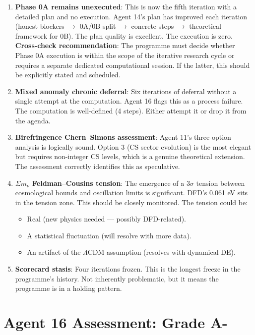 \documentclass[11pt,a4paper]{article}
\begin{document}
\begin{enumerate}
\item \textbf{Phase 0A remains unexecuted}: This is now the fifth iteration with a detailed plan and no execution. Agent 14's plan has improved each iteration (honest blockers $\to$ 0A/0B split $\to$ concrete steps $\to$ theoretical framework for 0B). The plan quality is excellent. The execution is zero. \textbf{Cross-check recommendation}: The programme must decide whether Phase 0A execution is within the scope of the iterative research cycle or requires a separate dedicated computational session. If the latter, this should be explicitly stated and scheduled.

\item \textbf{Mixed anomaly chronic deferral}: Six iterations of deferral without a single attempt at the computation. Agent 16 flags this as a process failure. The computation is well-defined (4 steps). Either attempt it or drop it from the agenda.

\item \textbf{Birefringence Chern--Simons assessment}: Agent 11's three-option analysis is logically sound. Option 3 (CS sector evolution) is the most elegant but requires non-integer CS levels, which is a genuine theoretical extension. The assessment correctly identifies this as speculative.

\item \textbf{$\Sigma m_\nu$ Feldman--Cousins tension}: The emergence of a $3\sigma$ tension between cosmological bounds and oscillation limits is significant. DFD's 0.061 eV sits in the tension zone. This should be closely monitored. The tension could be:
\begin{itemize}
\item Real (new physics needed --- possibly DFD-related).
\item A statistical fluctuation (will resolve with more data).
\item An artifact of the $\Lambda$CDM assumption (resolves with dynamical DE).
\end{itemize}

\item \textbf{Scorecard stasis}: Four iterations frozen. This is the longest freeze in the programme's history. Not inherently problematic, but it means the programme is in a holding pattern.
\end{enumerate}

\section{Agent 16 Assessment: Grade A-}
\end{document}

